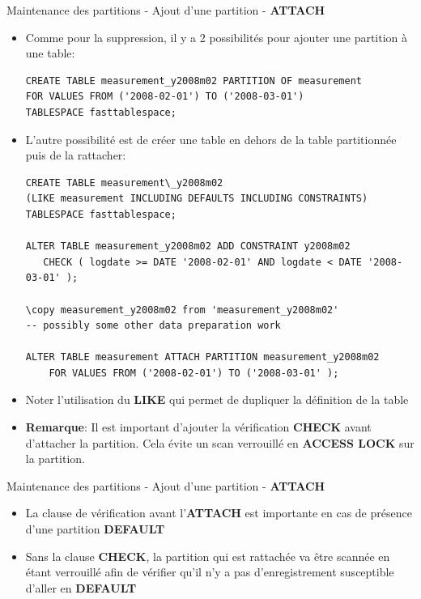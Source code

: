 \begin{frame}[fragile]{Maintenance des partitions - Ajout d'une partition - \textbf{ATTACH}}

   \begin{itemize}
      \item Comme pour la suppression, il y a 2 possibilités pour ajouter une partition à une table:
\begin{tiny}
\begin{Verbatim}[commandchars=\\\{\}]
CREATE TABLE measurement_y2008m02 PARTITION OF measurement
FOR VALUES FROM ('2008-02-01') TO ('2008-03-01')
TABLESPACE fasttablespace;
\end{Verbatim}
\end{tiny}
      \item L'autre possibilité est de créer une table en dehors de la table partitionnée puis de la rattacher:
\begin{tiny}
\begin{Verbatim}[commandchars=\#\{\}]
CREATE TABLE measurement\_y2008m02
(LIKE measurement INCLUDING DEFAULTS INCLUDING CONSTRAINTS)
TABLESPACE fasttablespace;

ALTER TABLE measurement_y2008m02 ADD CONSTRAINT y2008m02
   CHECK ( logdate >= DATE '2008-02-01' AND logdate < DATE '2008-03-01' );

\copy measurement_y2008m02 from 'measurement_y2008m02'
-- possibly some other data preparation work

ALTER TABLE measurement ATTACH PARTITION measurement_y2008m02
    FOR VALUES FROM ('2008-02-01') TO ('2008-03-01' );
\end{Verbatim}
\end{tiny}
      \item Noter l'utilisation du \textbf{LIKE} qui permet de dupliquer la définition de la table
      \item \textbf{Remarque}: Il est important d'ajouter la vérification \textbf{CHECK} avant d'attacher la partition. Cela évite un scan verrouillé en \textbf{ACCESS LOCK} sur la partition.
   \end{itemize}

\end{frame}


\begin{frame}[fragile]{Maintenance des partitions - Ajout d'une partition - \textbf{ATTACH}}

   \begin{itemize}
      \item La clause de vérification avant l'\textbf{ATTACH} est importante en cas de présence d'une partition \textbf{DEFAULT}
      \item Sans la clause \textbf{CHECK}, la partition qui est rattachée va être scannée en étant verrouillé afin de vérifier qu'il n'y a pas d'enregistrement susceptible d'aller en \textbf{DEFAULT}
   \end{itemize}

\end{frame}


